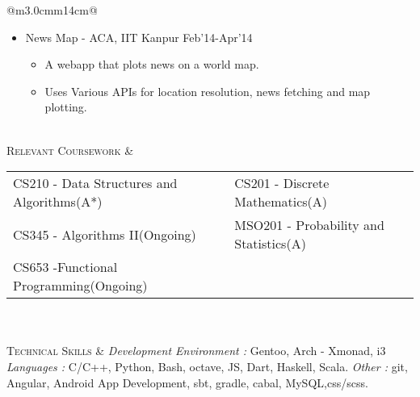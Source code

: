 \documentclass[a4paper]{article}
\begin{document}
\begin{longtable}{@{}m{3.0cm}m{14cm}@{}}
\begin{itemize}
\begin{itemize}
                                 \item Uses OpenCV for Image Processing and Manipulation.
                                 \end{itemize}
                               \item
                                 News Map - {\footnotesize ACA, IIT Kanpur }                               \hfill Feb'14-Apr'14
                                 \vspace{-2mm}\begin{itemize} \itemsep -2pt
                                 \item A webapp that plots news on a world map.
                                 \item Uses Various APIs for location resolution, news fetching and map plotting.
                                 \end{itemize}
                               \end{itemize}

\\

   \textrm{\textsc{Relevant Coursework}} &  
                                        \begin{tabular}{p{69mm} p{60mm}} 
                                          CS210 - Data Structures and Algorithms(A*) & CS201 - Discrete Mathematics(A)  \\
                                          CS345 - Algorithms II(Ongoing)             & MSO201 - Probability and Statistics(A) \\
                                          CS653 -Functional Programming(Ongoing) \\
                                        \end{tabular}

\\\\ 

  \textrm{\textsc{Technical Skills}} & 
                                       {\sl Development Environment :} Gentoo,
                                       Arch - Xmonad, i3 \newline
                                       {\sl Languages :} C/C++, Python, Bash, octave, JS, Dart, Haskell, Scala.\newline
                                       {\sl Other :} git, Angular, Android App
                                       Development, sbt, gradle, cabal, MySQL,css/scss.


\end{longtable}
\end{document}
